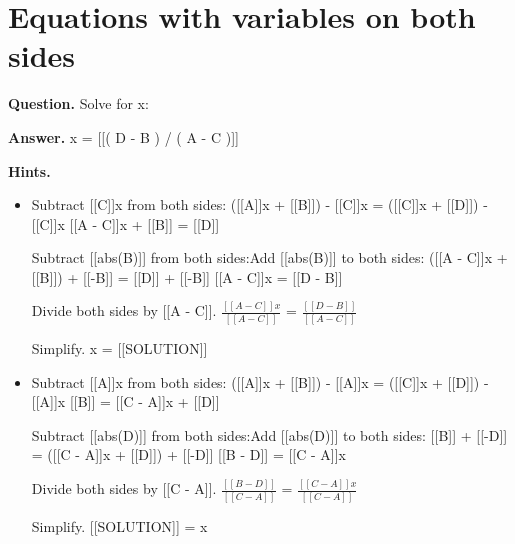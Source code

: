 \documentclass{article}
\begin{document}
\section*{Equations with variables on both sides}
\textbf{Question.} Solve for x:

\textbf{Answer.} x = [[( D - B ) / ( A - C )]]

\textbf{Hints.}
\begin{itemize}
  \item Subtract [[C]]x from both sides:
                    ([[A]]x + [[B]]) - [[C]]x = ([[C]]x + [[D]]) - [[C]]x
                    [[A - C]]x + [[B]] = [[D]]
                
                
                    Subtract [[abs(B)]] from both sides:Add [[abs(B)]] to both sides:
                    ([[A - C]]x + [[B]]) + [[-B]] = [[D]] + [[-B]]
                    [[A - C]]x = [[D - B]]
                
                
                    Divide both sides by [[A - C]].
                    $\frac{[[A - C]]x}{[[A - C]]}$ = $\frac{[[D - B]]}{[[A - C]]}$
                
                
                    Simplify.
                    x = [[SOLUTION]]
  \item Subtract [[A]]x from both sides:
                    ([[A]]x + [[B]]) - [[A]]x = ([[C]]x + [[D]]) - [[A]]x
                    [[B]] = [[C - A]]x + [[D]]
                
                
                    Subtract [[abs(D)]] from both sides:Add [[abs(D)]] to both sides:
                    [[B]] + [[-D]] = ([[C - A]]x + [[D]]) + [[-D]]
                    [[B - D]] = [[C - A]]x
                
                
                    Divide both sides by [[C - A]].
                    $\frac{[[B - D]]}{[[C - A]]}$ = $\frac{[[C - A]]x}{[[C - A]]}$
                
                
                    Simplify.
                    [[SOLUTION]] = x
\end{itemize}
\end{document}
